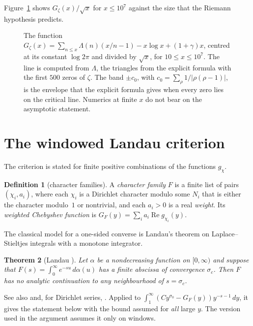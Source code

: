 \documentclass[11pt]{amsbook}
\theoremstyle{plain}
\newtheorem{theorem}{Theorem}[section]
\theoremstyle{definition}
\newtheorem{definition}[theorem]{Definition}
\theoremstyle{remark}
\numberwithin{equation}{section}
\numberwithin{figure}{chapter}
\numberwithin{table}{chapter}
\newcommand{\Gz}{G_{\zeta}}
\begin{document}
Figure~\ref{fig:gz} shows $\Gz(x)/\sqrt x$ for $x\le10^7$ against the
size that the Riemann hypothesis predicts.

\begin{figure}[htbp]
\centering

\caption{The function $\Gz(x)=\sum_{n\le x}\Lambda(n)(x/n-1)-x\log x
+(1+\gamma)x$, centred at its constant $\log2\pi$ and divided by
$\sqrt x$, for $10\le x\le10^7$. The line is computed from $\Lambda$,
the triangles from the explicit formula with the first $500$ zeros of
$\zeta$. The band $\pm c_0$, with $c_0=\sum_\rho1/|\rho(\rho-1)|$, is
the envelope that the explicit formula gives when every zero lies on
the critical line. Numerics at finite $x$ do not bear on the
asymptotic statement.}
\label{fig:gz}
\end{figure}

\section{The windowed Landau criterion}

The criterion is stated for finite positive combinations of the
functions $g_\chi$.

\begin{definition}[character families]\label{def:charfamily}
A \emph{character family} $F$ is a finite list of pairs
$(\chi_i,a_i)$, where each $\chi_i$ is a Dirichlet character modulo
some $N_i$ that is either the character modulo~$1$ or nontrivial, and
each $a_i>0$ is a real \emph{weight}. Its \emph{weighted Chebyshev
function} is $G_F(y)=\sum_ia_i\operatorname{Re}g_{\chi_i}(y)$.
\end{definition}

The classical model for a one-sided converse is Landau's theorem on
Laplace--Stieltjes integrals with a monotone integrator.

\begin{theorem}[Landau \cite{Landau1905}]\label{thm:landau}
Let $\alpha$ be a nondecreasing function on $[0,\infty)$ and suppose
that $F(s)=\int_0^\infty e^{-su}\,d\alpha(u)$ has a finite abscissa of
convergence $\sigma_c$. Then $F$ has no analytic continuation to any
neighbourhood of $s=\sigma_c$.
\end{theorem}

\noindent See also \cite{Widder1941} and, for Dirichlet series,
\cite{MontgomeryVaughan2007}. Applied to
$\int_1^\infty(Cy^{\sigma_0}-G_F(y))y^{-s-1}\,dy$, it gives the
statement below with the bound assumed for \emph{all} large $y$. The
version used in the argument assumes it only on windows.
\begin{figure}[tbp]
\centering

\end{figure}
\end{document}
